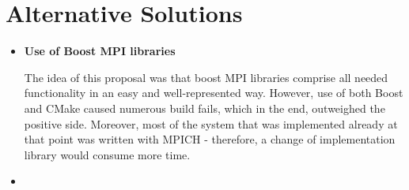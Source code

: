 \section{Alternative Solutions}

\begin{itemize}
\item{\textbf{Use of Boost MPI libraries}}

The idea of this proposal was that boost MPI libraries comprise all needed functionality in an easy and well-represented way. However, use of both Boost and CMake caused numerous build fails, which in the end, outweighed the positive side. Moreover, most of the system that was implemented already at that point was written with MPICH - therefore, a change of implementation library would consume more time.

\item{}
\end{itemize}
